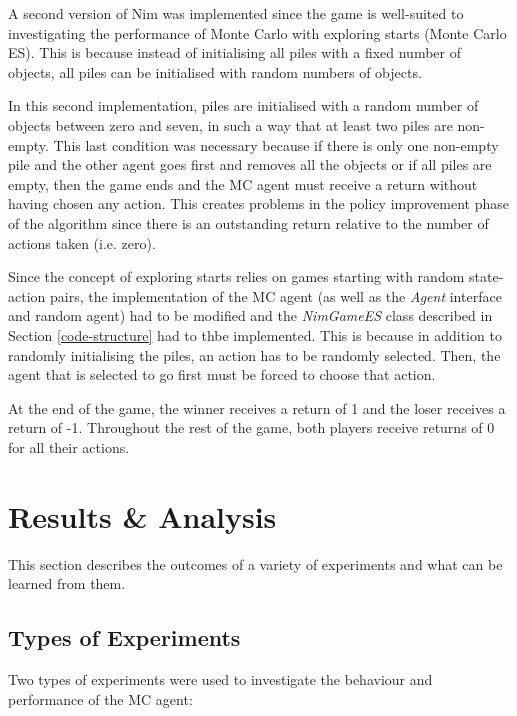 \documentclass[11pt,a4paper]{report}
\begin{document}
A second version of Nim was implemented since the game is well-suited to investigating the performance of Monte Carlo with exploring starts (Monte Carlo ES). This is because instead of initialising all piles with a fixed number of objects, all piles can be initialised with random numbers of objects.

In this second implementation, piles are initialised with a random number of objects between zero and seven, in such a way that at least two piles are non-empty. This last condition was necessary because if there is only one non-empty pile and the other agent goes first and removes all the objects or if all piles are empty, then the game ends and the MC agent must receive a return without having chosen any action. This creates problems in the policy improvement phase of the algorithm since there is an outstanding return relative to the number of actions taken (i.e. zero).

Since the concept of exploring starts relies on games starting with random state-action pairs, the implementation of the MC agent (as well as the \emph{Agent} interface and random agent) had to be modified and the \emph{NimGameES} class described in Section \ref{code-structure} had to thbe implemented. This is because in addition to randomly initialising the piles, an action has to be randomly selected. Then, the agent that is selected to go first must be forced to choose that action.

At the end of the game, the winner receives a return of 1 and the loser receives a return of -1. Throughout the rest of the game, both players receive returns of 0 for all their actions.


\chapter{Results \& Analysis}

This section describes the outcomes of a variety of experiments and what can be learned from them.


\section{Types of Experiments}
\label{sec:experiment-types}

Two types of experiments were used to investigate the behaviour and performance of the MC agent:
\end{document}
